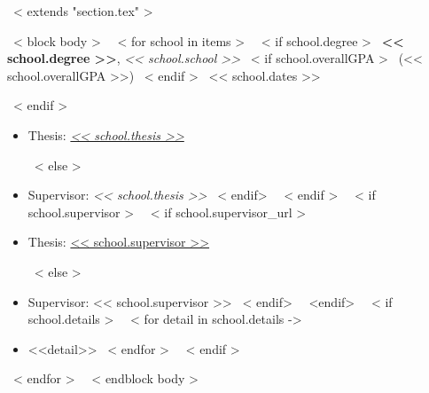 ~< extends "section.tex" >~

~< block body >~
~< for school in items >~
  ~< if school.degree >~
    \textbf{<< school.degree >>}, \emph{<< school.school >>}
    ~< if school.overallGPA >~
        (<< school.overallGPA >>)
    ~< endif >~
    \hfill << school.dates >> \par
  ~< endif >~
  \begin{itemize}
  ~< if school.thesis >~
    ~< if school.thesis_url >~
      \item Thesis: \href{<< school.thesis_url >>}{\textit{<< school.thesis >>}} \par
    ~< else >~
      \item Supervisor: \textit{<< school.thesis >>}
    ~< endif>~
  ~< endif >~
  ~< if school.supervisor >~
    ~< if school.supervisor_url >~
      \item Thesis: \href{<< school.supervisor_url >>}{<< school.supervisor >>} \par
    ~< else >~
      \item Supervisor: << school.supervisor >>
    ~< endif>~
  ~<endif>~
  ~< if school.details >~
    ~< for detail in school.details ->~
        \item <<detail>>
    ~< endfor >~
  ~< endif >~
  \end{itemize}
  \vspace{3mm}
~< endfor >~
\vspace{-3mm}
~< endblock body >~
